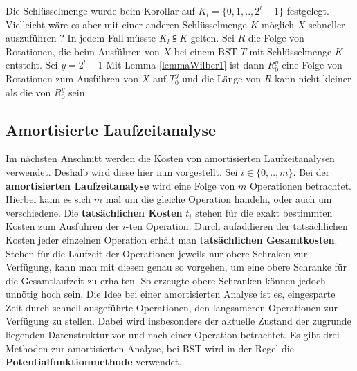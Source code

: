 \documentclass[a4paper,12pt]{article}
\begin{document}
\noindent Die Schlüsselmenge  wurde beim Korollar auf ${K_l = \{0,1,..,2^l -1\}}$ festgelegt. Vielleicht wäre es aber mit einer anderen Schlüsselmenge $K$ möglich $X$ schneller auszuführen ? In jedem Fall müsste $K_l \subseteqq K$ gelten. Sei $R$ die Folge von Rotationen, die beim Ausführen von $X$ bei einem BST $T$ mit Schlüsselmenge $K$ entsteht. Sei $y = 2^l -1$ Mit Lemma \ref{lemmaWilber1} ist dann $R_0^y$ eine Folge von Rotationen zum Ausführen von $X$ auf $T_0^y$ und die Länge von $R$ kann nicht kleiner als die von $R_0^y$ sein. 



\subsection{Amortisierte Laufzeitanalyse}
Im nächsten Anschnitt werden die Kosten von amortisierten Laufzeitanalysen verwendet. Deshalb wird diese hier nun vorgestellt.
Sei $i \in \{0,..,m\}$. Bei der \textbf{amortisierten Laufzeitanalyse} wird eine Folge von $m$ Operationen betrachtet. Hierbei kann es sich $m$ mal um die gleiche Operation handeln, oder auch um verschiedene. Die \textbf{tatsächlichen Kosten}  $t_i$ stehen für die exakt bestimmten Kosten zum Ausführen der $i$-ten Operation. Durch aufaddieren der tatsächlichen Kosten jeder einzelnen Operation erhält man \textbf{tatsächlichen Gesamtkosten}.  Stehen für die Laufzeit der Operationen jeweils nur obere Schraken zur Verfügung, kann man mit diesen genau so vorgehen, um eine obere Schranke für die Gesamtlaufzeit zu erhalten. So erzeugte obere Schranken können jedoch unnötig hoch sein. Die Idee bei einer amortisierten Analyse ist es, eingesparte Zeit durch schnell ausgeführte Operationen, den langsameren Operationen zur Verfügung zu stellen. Dabei wird insbesondere der aktuelle Zustand der zugrunde liegenden Datenstruktur vor und nach einer Operation betrachtet. Es gibt drei Methoden zur amortisierten Analyse, bei BST wird in der Regel die \textbf{Potentialfunktionmethode} verwendet.
\end{document}
